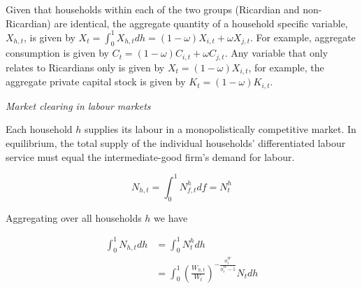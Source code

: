 \documentclass[a4paper,11pt]{article}
\numberwithin{equation}{section}
\begin{document}
	Given that households within each of the two groups (Ricardian and non-Ricardian) are identical, the aggregate quantity of a household specific variable, $X_{h,t}$, is given by $X_t=\int_{0}^{1}X_{h,t}dh=(1-\omega)X_{i,t}+\omega X_{j,t}$. For example, aggregate consumption is given by $C_t=(1-\omega)C_{i,t}+\omega C_{j,t}$. Any variable that only relates to Ricardians only is given by $X_t=(1-\omega)X_{i,t}$, for example, the aggregate private capital stock is given by $K_t=(1-\omega)K_{i,t}$.
	
	\vspace{8pt}
	\textit{Market clearing in labour markets}
	\vspace{8pt}
	
	Each household $h$ supplies its labour in a monopolistically competitive market. In equilibrium, the total supply of the individual households' differentiated labour service must equal the intermediate-good firm's demand for labour.
	
	\begin{equation} \label{tot_n}
	N_{h,t}=\int_{0}^{1}N_{f,t}^hdf=N_t^h
	\end{equation} 
	
	Aggregating over all households $h$ we have
	
	\begin{equation}
	\begin{split}
		\int_{0}^{1}N_{h,t}dh&=\int_{0}^{1}N_t^hdh\\
		& =\int_{0}^{1}\left(\frac{W_{h,t}}{W_t}\right)^{-\frac{\phi_t^W}{\phi_t^W-1}}N_tdh\\
	\end{split}
	\end{equation}
	
%	
%	
	
%	
%	
	
\end{document}
